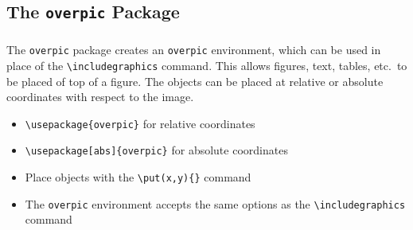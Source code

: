 \documentclass[article]{beamer}
\begin{document}
\begin{frame}[fragile]
\begin{columns}
\begin{column}{0.5\textwidth}
    \end{column}
  \end{columns}
\end{frame}

\subsection{The \texttt{overpic} Package}
\begin{frame}
  \frametitle{\thesubsection}
  \framesubtitle{}
    The \texttt{overpic} package creates an \texttt{overpic} environment,
    which can be used in place of the \texttt{\textbackslash includegraphics}
    command.  This allows figures, text, tables, etc.\ to be placed of top of
    a figure.  The objects can be placed at relative or absolute coordinates
    with respect to the image. 
    \begin{itemize}%
      \item \texttt{\textbackslash usepackage\{overpic\}} for relative
        coordinates
      \item \texttt{\textbackslash usepackage[abs]\{overpic\}} for absolute
        coordinates
      \item Place objects with the \texttt{\textbackslash put(x,y)\{\}} command
      \item The \texttt{overpic} environment accepts the same options as the
        \texttt{\textbackslash includegraphics} command
    \end{itemize}
    
\end{frame}
\end{document}
